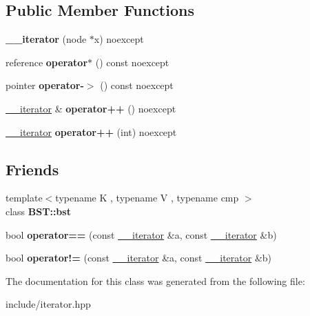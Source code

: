 \subsection*{Public Member Functions}
\begin{DoxyCompactItemize}
\item 
\mbox{\label{classAP__it_1_1____iterator_a7286a573bdc1fa300c664c316564c1a2}} 
{\bfseries \+\_\+\+\_\+iterator} (node $\ast$x) noexcept
\item 
\mbox{\label{classAP__it_1_1____iterator_a8bbe7fd8bc25d7f80eecdec977272828}} 
reference {\bfseries operator$\ast$} () const noexcept
\item 
\mbox{\label{classAP__it_1_1____iterator_ad592364949f9c5ff5173f39d31f0eb11}} 
pointer {\bfseries operator-\/$>$} () const noexcept
\item 
\mbox{\label{classAP__it_1_1____iterator_a54350866b6f1b6a9be788805a1982142}} 
\hyperlink{classAP__it_1_1____iterator}{\+\_\+\+\_\+iterator} \& {\bfseries operator++} () noexcept
\item 
\mbox{\label{classAP__it_1_1____iterator_a690a182c9ef272c5acca82bb2dfe211e}} 
\hyperlink{classAP__it_1_1____iterator}{\+\_\+\+\_\+iterator} {\bfseries operator++} (int) noexcept
\end{DoxyCompactItemize}
\subsection*{Friends}
\begin{DoxyCompactItemize}
\item 
\mbox{\label{classAP__it_1_1____iterator_a58ed1dfd1f1b7dd9f3d4f2695f53ac12}} 
{\footnotesize template$<$typename K , typename V , typename cmp $>$ }\\class {\bfseries B\+S\+T\+::bst}
\item 
\mbox{\label{classAP__it_1_1____iterator_a2e5014cb825532053115734598e16318}} 
bool {\bfseries operator==} (const \hyperlink{classAP__it_1_1____iterator}{\+\_\+\+\_\+iterator} \&a, const \hyperlink{classAP__it_1_1____iterator}{\+\_\+\+\_\+iterator} \&b)
\item 
\mbox{\label{classAP__it_1_1____iterator_add0144e7693bde5e4b509b5fd8dc5c96}} 
bool {\bfseries operator!=} (const \hyperlink{classAP__it_1_1____iterator}{\+\_\+\+\_\+iterator} \&a, const \hyperlink{classAP__it_1_1____iterator}{\+\_\+\+\_\+iterator} \&b)
\end{DoxyCompactItemize}


The documentation for this class was generated from the following file\+:\begin{DoxyCompactItemize}
\item 
include/iterator.\+hpp\end{DoxyCompactItemize}

